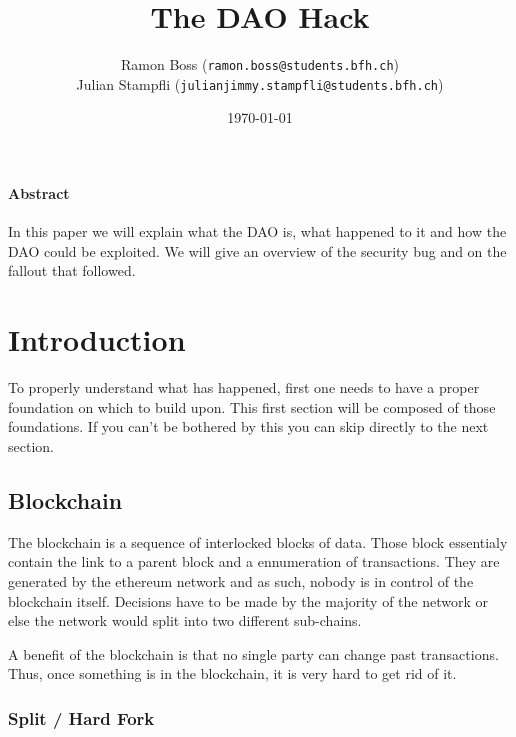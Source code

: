 \documentclass[a4paper, 11pt]{scrartcl}
\begin{document}
\title{The DAO Hack}
\date{\today}   %
\author{
  Ramon Boss (\texttt{ramon.boss@students.bfh.ch}) \\
  Julian Stampfli (\texttt{julianjimmy.stampfli@students.bfh.ch}) 
}
 
\maketitle

\paragraph{Abstract}

In this paper we will explain what the DAO is, what happened to it and how the DAO could be exploited. We will give an overview of the security bug and on the fallout that followed.

\setcounter{tocdepth}{2}
\tableofcontents
\clearpage

\section{Introduction}

To properly understand what has happened, first one needs to have a proper foundation on which to build upon. This first section will be composed of those foundations. If you can't be bothered by this you can skip directly to the next section. 

\subsection{Blockchain}

The blockchain is a sequence of interlocked blocks of data. Those block essentialy contain the link to a parent block and a ennumeration of transactions. They are generated by the ethereum network and as such, nobody is in control of the blockchain itself. Decisions have to be made by the majority of the network or else the network would split into two different sub-chains. \cite{blockchainKai}

A benefit of the blockchain is that no single party can change past transactions. Thus, once something is in the blockchain, it is very hard to get rid of it. \cite{blockchainKai}

\subsubsection{Split / Hard Fork}
\end{document}

